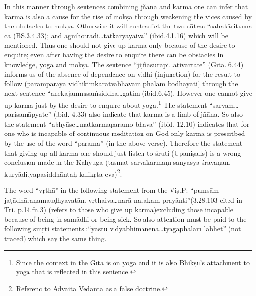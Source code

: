 In this manner through sentences combining jñāna and karma one can infer that karma is also a cause for the rise of mokṣa through weakening the vices caused by the obstacles to mokṣa. Otherwise it will contradict the two sūtras “sahakāritvena ca (BS.3.4.33); and agnihotrādi…tatkāryāyaiva” (ibid.4.1.16) which will be mentioned. Thus one should not give up karma only because of the desire to enquire; even after having the desire to enquire there can be obstacles in knowledge, yoga and mokṣa. The sentence “jijñāsurapi…ativartate” (Gītā. 6.44) informs us of the absence of dependence on vidhi (injunction) for the result to follow (paramparayā vidhikimkaratvābhāvam phalam bodhayati) through the next sentence “anekajanmasaṁsiddha…gatim (ibid.6.45). However one cannot give up karma just by the desire to enquire about yoga.\footnote{Since the context in the Gītā is on yoga and it is also Bhikṣu’s attachment to yoga that is reflected in this sentence.} The statement “sarvam…parisamāpyate” (ibid. 4.33) also indicate that karma is a limb of jñāna. So also the statement “abhyāse…matkarmaparamo bhava” (ibid. 12.10) indicates that for one who is incapable of continuous meditation on God only karma is prescribed by the use of the word “parama” (in the above verse). Therefore the statement that giving up all karma one should just listen to śruti (Upaniṣads) is a wrong conclusion made in the Kaliyuga (tasmāt sarvakarmāṇi sanyasya śravaṇam kuryādityapasiddhāntaḥ kalikṛta eva)\footnote{Referenc to Advaita Vedānta as a false doctrine.}. 

The word “vṛthā” in the following statement from the Viṣ.P: “pumsām jaṭādhāraṇamauḍhyavatām vṛthaiva…narā narakam prayānti”\break (3.28.103 cited in Tri. p.14.fn.3) (refers to those who give up karma)\break excluding those incapable because of being in samādhi or being sick.  So also attention must be paid to the following smṛti statements :\break “yastu vidyābhimānena…tyāgaphalam labhet” (not traced) which say the same thing.

